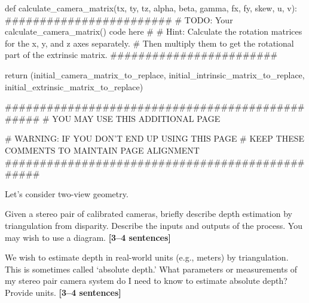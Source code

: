 \documentclass{csci1430}
\begin{document}
\begin{answer}[height=46]
\begin{python}
def calculate_camera_matrix(tx, ty, tz, alpha, beta, gamma, fx, fy, skew, u, v):
    ########################
    # TODO: Your calculate_camera_matrix() code here #
    # Hint: Calculate the rotation matrices for the x, y, and z axes separately.
    # Then multiply them to get the rotational part of the extrinsic matrix.
    ########################
    
    return (initial_camera_matrix_to_replace, 
    initial_intrinsic_matrix_to_replace, 
    initial_extrinsic_matrix_to_replace)
\end{python}
\end{answer}

\pagebreak
\begin{answer}[height=46]
\begin{python}
################################################
# YOU MAY USE THIS ADDITIONAL PAGE

# WARNING: IF YOU DON'T END UP USING THIS PAGE
# KEEP THESE COMMENTS TO MAINTAIN PAGE ALIGNMENT
################################################
\end{python}
\end{answer}
    


\pagebreak
\begin{question}[points=4,drawbox=false]
Let's consider two-view geometry.
\end{question}

\begin{subquestion}[points=2]
Given a stereo pair of calibrated cameras, briefly describe depth estimation by triangulation from disparity. Describe the inputs and outputs of the process. You may wish to use a diagram. \textbf{[3--4 sentences]}
\end{subquestion}

\begin{answer}[height=30]
\end{answer}

\pagebreak
\begin{subquestion}[points=2]
We wish to estimate depth in real-world units (e.g., meters) by triangulation. This is sometimes called `absolute depth.' What parameters or measurements of my stereo pair camera system do I need to know to estimate absolute depth? Provide units. \textbf{[3--4 sentences]}
\end{subquestion}
\end{document}
